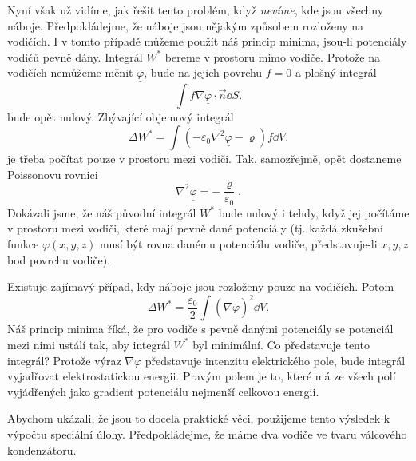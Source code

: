     Nyní však už vidíme, jak řešit tento problém, když \emph{nevíme}, kde jsou všechny náboje.
    Předpokládejme, že náboje jsou nějakým způsobem rozloženy na vodičích. I v tomto případě můžeme
    použít náš princip minima, jsou-li potenciály vodičů pevně dány. Integrál \(W^*\) bereme v
    prostoru mimo vodiče. Protože na vodičích nemůžeme měnit \(\underline{\varphi}\), bude na jejich
    povrchu \(f= 0\) a plošný integrál
    \begin{equation*}
      \int f\nabla\underline{\varphi}\cdot\vec{n}\dd{S}.
    \end{equation*}
    bude opět nulový. Zbývající objemový integrál
    \begin{equation*}
      \Delta W^* = \int(-\varepsilon_0\nabla^2\underline{\varphi} - \varrho)f\dd{V}.
    \end{equation*}
    je třeba počítat pouze v prostoru mezi vodiči. Tak, samozřejmě, opět dostaneme Poissonovu
    rovnici
    \begin{equation*}
      \nabla^2\underline{\varphi} = -\dfrac{\varrho}{\varepsilon_0}.
    \end{equation*}
    Dokázali jsme, že náš původní integrál \(W^*\) bude nulový i tehdy, když jej počítáme v prostoru
    mezi vodiči, které mají pevně dané potenciály (tj. každá zkušební funkce \(\varphi(x, y, z)\)
    musí být rovna danému potenciálu vodiče, představuje-li \(x, y, z\) bod povrchu vodiče). 
    
    Existuje zajímavý případ, kdy náboje jsou rozloženy pouze na vodičích. Potom
    \begin{equation*}
      \Delta W^* = \dfrac{\varepsilon_0}{2}\int(\nabla\underline{\varphi})^2\dd{V}.
    \end{equation*}
    Náš princip minima říká, že pro vodiče s pevně danými potenciály se potenciál mezi nimi ustálí
    tak, aby integrál \(W^*\) byl minimální. Co představuje tento integrál? Protože výraz
    \(\nabla\varphi\) představuje intenzitu elektrického pole, bude integrál vyjadřovat
    elektrostatickou energii. Pravým polem je to, které má ze všech polí vyjádřených jako gradient
    potenciálu nejmenší celkovou energii. 
    

    Abychom ukázali, že jsou to docela praktické věci, použijeme tento výsledek k výpočtu speciální
    úlohy. Předpokládejme, že máme dva vodiče ve tvaru válcového kondenzátoru.

